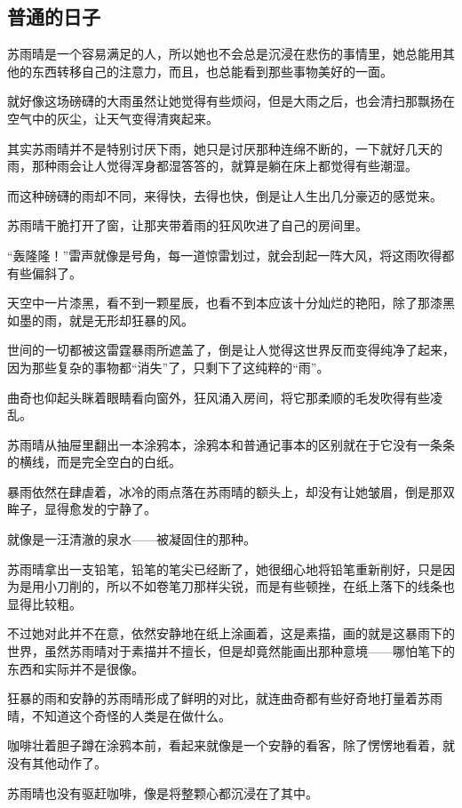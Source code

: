 \subsection{普通的日子}

苏雨晴是一个容易满足的人，所以她也不会总是沉浸在悲伤的事情里，她总能用其他的东西转移自己的注意力，而且，也总能看到那些事物美好的一面。

就好像这场磅礴的大雨虽然让她觉得有些烦闷，但是大雨之后，也会清扫那飘扬在空气中的灰尘，让天气变得清爽起来。

其实苏雨晴并不是特别讨厌下雨，她只是讨厌那种连绵不断的，一下就好几天的雨，那种雨会让人觉得浑身都湿答答的，就算是躺在床上都觉得有些潮湿。

而这种磅礴的雨却不同，来得快，去得也快，倒是让人生出几分豪迈的感觉来。

苏雨晴干脆打开了窗，让那夹带着雨的狂风吹进了自己的房间里。

“轰隆隆！”雷声就像是号角，每一道惊雷划过，就会刮起一阵大风，将这雨吹得都有些偏斜了。

天空中一片漆黑，看不到一颗星辰，也看不到本应该十分灿烂的艳阳，除了那漆黑如墨的雨，就是无形却狂暴的风。

世间的一切都被这雷霆暴雨所遮盖了，倒是让人觉得这世界反而变得纯净了起来，因为那些复杂的事物都“消失”了，只剩下了这纯粹的“雨”。

曲奇也仰起头眯着眼睛看向窗外，狂风涌入房间，将它那柔顺的毛发吹得有些凌乱。

苏雨晴从抽屉里翻出一本涂鸦本，涂鸦本和普通记事本的区别就在于它没有一条条的横线，而是完全空白的白纸。

暴雨依然在肆虐着，冰冷的雨点落在苏雨晴的额头上，却没有让她皱眉，倒是那双眸子，显得愈发的宁静了。

就像是一汪清澈的泉水——被凝固住的那种。

苏雨晴拿出一支铅笔，铅笔的笔尖已经断了，她很细心地将铅笔重新削好，只是因为是用小刀削的，所以不如卷笔刀那样尖锐，而是有些顿挫，在纸上落下的线条也显得比较粗。

不过她对此并不在意，依然安静地在纸上涂画着，这是素描，画的就是这暴雨下的世界，虽然苏雨晴对于素描并不擅长，但是却竟然能画出那种意境——哪怕笔下的东西和实际并不是很像。

狂暴的雨和安静的苏雨晴形成了鲜明的对比，就连曲奇都有些好奇地打量着苏雨晴，不知道这个奇怪的人类是在做什么。

咖啡壮着胆子蹲在涂鸦本前，看起来就像是一个安静的看客，除了愣愣地看着，就没有其他动作了。

苏雨晴也没有驱赶咖啡，像是将整颗心都沉浸在了其中。

